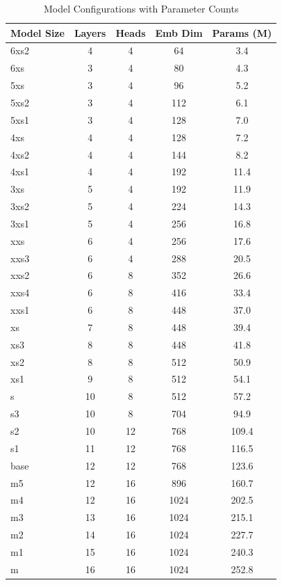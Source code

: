 \documentclass[11pt]{article}
\theoremstyle{plain}
\theoremstyle{definition}
\begin{document}
\begin{nips}
    \begin{table}[ht]
    \centering
    \caption{Model Configurations with Parameter Counts}
    \begin{tabular}{lcccc}
        \toprule
        \textbf{Model Size} & \textbf{Layers} & \textbf{Heads} & \textbf{Emb Dim} & \textbf{Params (M)} \\
        \hline
        6xs2  & 4  & 4  & 64   & 3.4  \\
        6xs   & 3  & 4  & 80   & 4.3  \\
        5xs   & 3  & 4  & 96   & 5.2  \\
        5xs2  & 3  & 4  & 112  & 6.1  \\
        5xs1  & 3  & 4  & 128  & 7.0  \\
        4xs   & 4  & 4  & 128  & 7.2  \\
        4xs2 & 4  & 4  & 144  & 8.2  \\
        4xs1  & 4  & 4  & 192  & 11.4 \\
        3xs  & 5  & 4  & 192  & 11.9 \\
        3xs2 & 5  & 4  & 224  & 14.3 \\
        3xs1 & 5  & 4  & 256  & 16.8 \\
        xxs  & 6  & 4  & 256  & 17.6 \\
        xxs3 & 6  & 4  & 288  & 20.5 \\
        xxs2 & 6  & 8  & 352  & 26.6 \\
        xxs4 & 6  & 8  & 416  & 33.4 \\
        xxs1 & 6  & 8  & 448  & 37.0 \\
        xs   & 7  & 8  & 448  & 39.4 \\
        xs3  & 8  & 8  & 448  & 41.8 \\
        xs2  & 8  & 8  & 512  & 50.9 \\
        xs1  & 9  & 8  & 512  & 54.1 \\
        s    & 10 & 8  & 512  & 57.2 \\
        s3   & 10 & 8  & 704  & 94.9 \\
        s2   & 10 & 12 & 768  & 109.4 \\
        s1   & 11 & 12 & 768  & 116.5 \\
        base & 12 & 12 & 768  & 123.6 \\
        m5   & 12 & 16 & 896  & 160.7 \\
        m4   & 12 & 16 & 1024 & 202.5 \\
        m3   & 13 & 16 & 1024 & 215.1 \\
        m2   & 14 & 16 & 1024 & 227.7 \\
        m1   & 15 & 16 & 1024 & 240.3 \\
        m    & 16 & 16 & 1024 & 252.8 \\
        \bottomrule
    \end{tabular}
    \label{tab:model_sizes}
\end{table}
\end{nips}
\end{document}
